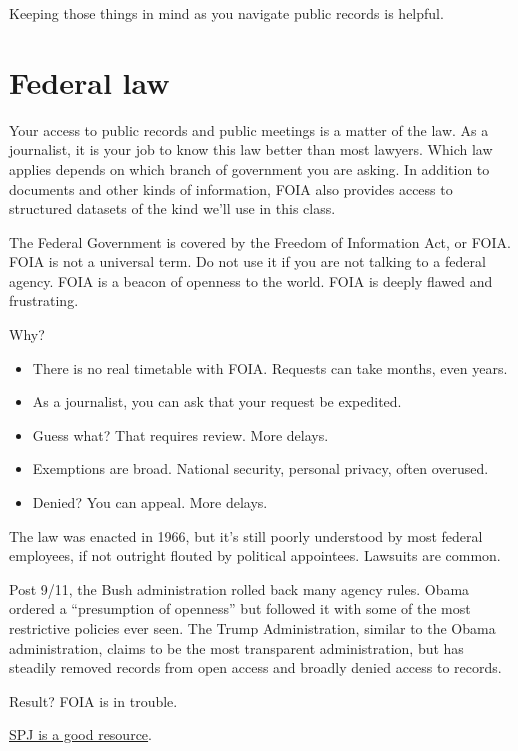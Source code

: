 \documentclass[
  letterpaper,
  DIV=11,
  numbers=noendperiod]{scrreprt}
\providecommand{\tightlist}{%
  \setlength{\itemsep}{0pt}\setlength{\parskip}{0pt}}\usepackage{longtable,booktabs,array}
\begin{document}
Keeping those things in mind as you navigate public records is helpful.

\hypertarget{federal-law}{%
\section{Federal law}\label{federal-law}}

Your access to public records and public meetings is a matter of the
law. As a journalist, it is your job to know this law better than most
lawyers. Which law applies depends on which branch of government you are
asking. In addition to documents and other kinds of information, FOIA
also provides access to structured datasets of the kind we'll use in
this class.

The Federal Government is covered by the Freedom of Information Act, or
FOIA. FOIA is not a universal term. Do not use it if you are not talking
to a federal agency. FOIA is a beacon of openness to the world. FOIA is
deeply flawed and frustrating.

Why?

\begin{itemize}
\tightlist
\item
  There is no real timetable with FOIA. Requests can take months, even
  years.
\item
  As a journalist, you can ask that your request be expedited.
\item
  Guess what? That requires review. More delays.
\item
  Exemptions are broad. National security, personal privacy, often
  overused.
\item
  Denied? You can appeal. More delays.
\end{itemize}

The law was enacted in 1966, but it's still poorly understood by most
federal employees, if not outright flouted by political appointees.
Lawsuits are common.

Post 9/11, the Bush administration rolled back many agency rules. Obama
ordered a ``presumption of openness'' but followed it with some of the
most restrictive policies ever seen. The Trump Administration, similar
to the Obama administration, claims to be the most transparent
administration, but has steadily removed records from open access and
broadly denied access to records.

Result? FOIA is in trouble.

\href{https://www.spj.org/foi-guide-pros.asp}{SPJ is a good resource}.
\end{document}
